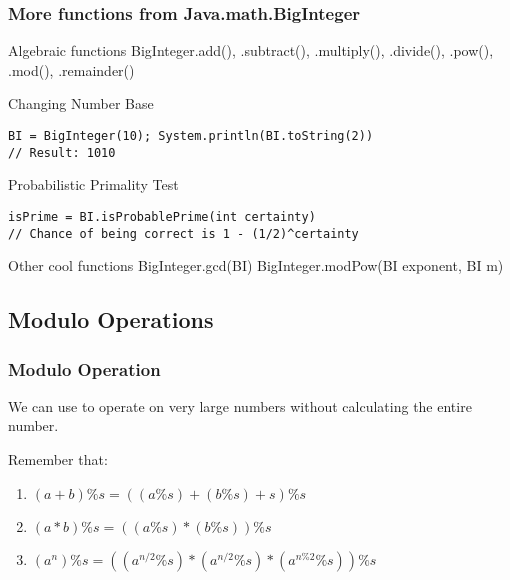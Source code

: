 \begin{frame}[fragile]
  \frametitle{More functions from Java.math.BigInteger}
{\smaller

  \begin{block}{Algebraic functions}
    BigInteger.add(), .subtract(), .multiply(), .divide(),
    .pow(), .mod(), .remainder()
  \end{block}

  \begin{block}{Changing Number Base}
\begin{verbatim}
BI = BigInteger(10); System.println(BI.toString(2))
// Result: 1010
\end{verbatim}
  \end{block}

  \begin{block}{Probabilistic Primality Test}
\begin{verbatim}
isPrime = BI.isProbablePrime(int certainty)
// Chance of being correct is 1 - (1/2)^certainty
\end{verbatim}
  \end{block}


\begin{block}{Other cool functions}
  BigInteger.gcd(BI)
  BigInteger.modPow(BI exponent, BI m)
\end{block}}
\end{frame}

\subsection{Modulo Operations}
\begin{frame}
  \frametitle{Modulo Operation}

  {\smaller
  We can use  to operate on very large
  numbers without calculating the entire number.

  \bigskip

  Remember that:
  \begin{enumerate}
  \item $(a+b)\%s = ((a\%s)+(b\%s)+s)\%s$
  \item $(a*b)\%s = ((a\%s)*(b\%s))\%s$
  \item $(a^n)\%s = ((a^{n/2}\%s)*(a^{n/2}\%s)*(a^{n\%2}\%s))\%s$
  \end{enumerate}

  }
\end{frame}

